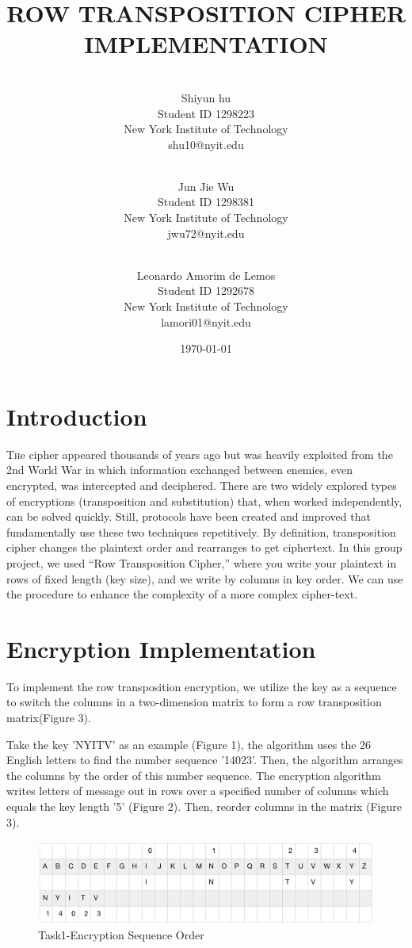 \documentclass[twoside,twocolumn]{article}
\title{ROW TRANSPOSITION CIPHER IMPLEMENTATION} %
\author{ \\ \footnotesize Shiyun hu  \\ \footnotesize Student ID 1298223\\ \footnotesize New York Institute of Technology \\ \footnotesize shu10@nyit.edu \and \\\footnotesize Jun Jie Wu \\ \footnotesize Student ID 1298381 \\ \footnotesize New York Institute of Technology \\ \footnotesize jwu72@nyit.edu  \and \\ \footnotesize Leonardo Amorim de Lemos  \\ \footnotesize Student ID 1292678\\ \footnotesize New York Institute of Technology\\ \footnotesize lamori01@nyit.edu \\}
\date{\today} %
\begin{document}
\maketitle


\section{Introduction}

\lettrine[nindent=2em,lines=1] {T}he cipher appeared thousands of years ago but was heavily exploited from the 2nd World War in which information exchanged between enemies, even encrypted, was intercepted and deciphered. There are two widely explored types of encryptions (transposition and substitution) that, when worked independently, can be solved quickly. Still, protocols have been created and improved that fundamentally use these two techniques repetitively. By definition, transposition cipher changes the plaintext order and rearranges to get ciphertext. In this group project, we used “Row Transposition Cipher,” where you write your plaintext in rows of fixed length (key size), and we write by columns in key order. We can use the procedure to enhance the complexity of a more complex cipher-text.


\section{Encryption Implementation}
To implement the row transposition encryption, we utilize the key as a sequence to switch the columns in a two-dimension matrix to form a row transposition matrix(Figure 3).

Take the key 'NYITV' as an example (Figure 1), the algorithm uses the 26 English letters to find the number sequence '14023'. Then, the algorithm arranges the columns by the order of this number sequence. The encryption algorithm writes letters of message out in rows over a specified number of columns which equals the key length '5' (Figure 2). Then, reorder columns in the matrix (Figure 3). \\



\begin{figure}[!ht]
  \centering
  \includegraphics[scale=0.3]{./Graphs/Figure1.1.png}
  \caption{Task1-Encryption Sequence Order}
  \label{fig:testfig1}
\end{figure}
\end{document}
